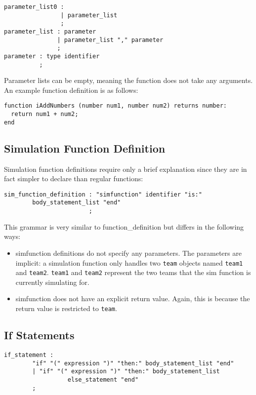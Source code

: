 \begin{verbatim}
parameter_list0 :
                | parameter_list
                ;
parameter_list : parameter
               | parameter_list "," parameter
               ;
parameter : type identifier
          ;
\end{verbatim}

Parameter lists can be empty, meaning the function does not take any
arguments. An example function definition is as follows:

\begin{verbatim}
function iAddNumbers (number num1, number num2) returns number:
  return num1 + num2;
end
\end{verbatim}

\subsection{Simulation Function Definition}\label{SimDef}
Simulation function definitions require only a brief explanation since
they are in fact simpler to declare than regular functions:

\begin{verbatim}
sim_function_definition : "simfunction" identifier "is:"
        body_statement_list "end"
                        ;
\end{verbatim}

This grammar is very similar to function\_definition but differs in the
following ways: 

\begin{itemize}
\item
  simfunction definitions do not specify any parameters. The
  parameters are implicit: a simulation function only handles two
  \texttt{team} objects named \texttt{team1} and
  \texttt{team2}. \texttt{team1} and \texttt{team2} represent the two
  teams that the sim function is currently simulating for.
\item
  simfunction does not have an explicit return value. Again, this is
  because the return value is restricted to \texttt{team}.
\end{itemize}

\subsection{If Statements}

\begin{verbatim}
if_statement : 
        "if" "(" expression ")" "then:" body_statement_list "end"
        | "if" "(" expression ")" "then:" body_statement_list
                  else_statement "end"
        ;
\end{verbatim}

